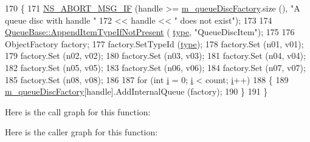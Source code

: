 \begin{DoxyCode}
170 \{
171   \hyperlink{group__fatal_ga6653324225bc139e46deea177614ceee}{NS\_ABORT\_MSG\_IF} (handle >= \hyperlink{classns3_1_1TrafficControlHelper_ae4ef4231b502104a4fd4245e53f9ae68}{m\_queueDiscFactory}.size (), \textcolor{stringliteral}{"A queue disc
       with handle "}
172                    << handle << \textcolor{stringliteral}{" does not exist"});
173 
174   \hyperlink{classns3_1_1QueueBase_a7b85284de63a5642e623f32d096dbcd9}{QueueBase::AppendItemTypeIfNotPresent} (
      \hyperlink{visualizer-ideas_8txt_add98db9e15e2a58cf2b57623e7aa893a}{type}, \textcolor{stringliteral}{"QueueDiscItem"});
175 
176   ObjectFactory factory;
177   factory.SetTypeId (\hyperlink{visualizer-ideas_8txt_add98db9e15e2a58cf2b57623e7aa893a}{type});
178   factory.Set (n01, v01);
179   factory.Set (n02, v02);
180   factory.Set (n03, v03);
181   factory.Set (n04, v04);
182   factory.Set (n05, v05);
183   factory.Set (n06, v06);
184   factory.Set (n07, v07);
185   factory.Set (n08, v08);
186 
187   \textcolor{keywordflow}{for} (\textcolor{keywordtype}{int} \hyperlink{bernuolliDistribution_8m_a6f6ccfcf58b31cb6412107d9d5281426}{i} = 0; \hyperlink{bernuolliDistribution_8m_a6f6ccfcf58b31cb6412107d9d5281426}{i} < count; \hyperlink{bernuolliDistribution_8m_a6f6ccfcf58b31cb6412107d9d5281426}{i}++)
188     \{
189       \hyperlink{classns3_1_1TrafficControlHelper_ae4ef4231b502104a4fd4245e53f9ae68}{m\_queueDiscFactory}[handle].AddInternalQueue (factory);
190     \}
191 \}
\end{DoxyCode}


Here is the call graph for this function\+:




Here is the caller graph for this function\+:


